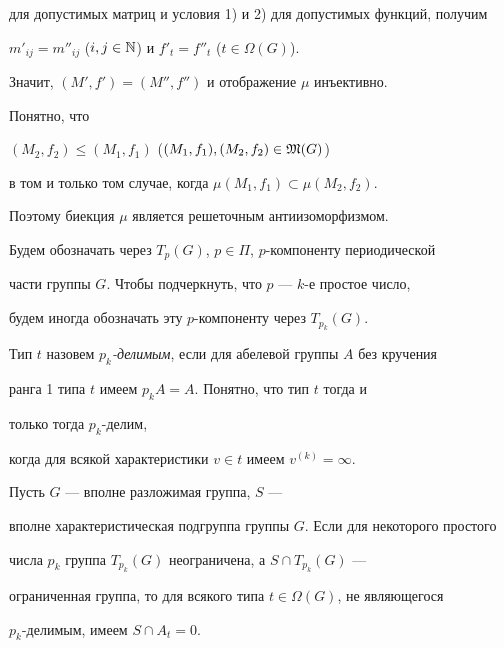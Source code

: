 \begin{pf}
для допустимых матриц и условия 1) и 2) для допустимых функций, получим


$m'_{ij}=m''_{ij}$ ($i,j\in\Bbb N$) и $f'_t=f''_t$ ($t\in\Omega(G)$).


Значит, $(M', f')=(M'', f'')$ и отображение $\mu$ инъективно.





Понятно, что


$(M_2, f_2)\leqslant (M_1, f_1)$ ($(M_1, f_1), (M_2, f_2)\in\frak M(G)$)


в том и только том случае, когда $\mu (M_1, f_1)\subset\mu (M_2, f_2)$.


Поэтому биекция $\mu$ является решеточным антиизоморфизмом.


\end{pf}





Будем обозначать через $T_p(G)$, $p\in\Pi$, $p$-компоненту периодической


части группы $G$. Чтобы подчеркнуть, что $p$ --- $k$-е простое число,


будем иногда обозначать эту $p$-компоненту через $T_{p_k}(G)$.





Тип $t$ назовем {\em $p_k$-делимым}, если для абелевой группы $A$ без кручения


ранга 1 типа $t$ имеем $p_kA=A$. Понятно, что тип $t$ тогда и


только тогда $p_k$-делим,


когда для всякой характеристики $v\in t$ имеем $v^{(k)}=\infty$.





\begin{cor}


Пусть $G$ --- вполне разложимая группа, $S$ ---


вполне характеристическая подгруппа группы $G$. Если для некоторого простого


числа $p_k$ группа $T_{p_k}(G)$ неограничена, а $S\cap T_{p_k}(G)$ ---


ограниченная группа, то для всякого типа $t\in\Omega(G)$, не являющегося


$p_k$-делимым, имеем $S\cap A_t=0$.


\end{cor}





